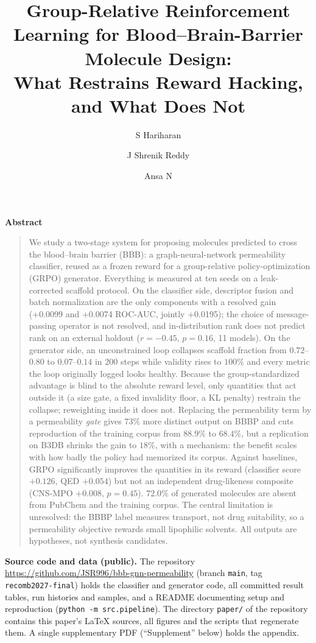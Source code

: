 \documentclass[10pt,letterpaper]{article}
\title{Group-Relative Reinforcement Learning for Blood--Brain-Barrier Molecule Design:\\
What Restrains Reward Hacking, and What Does Not}
\author{S Hariharan \and J Shrenik Reddy \and Ansa N}
\date{}
\newcommand{\REPO}{\url{https://github.com/JSR996/bbb-gnn-permeability}}
\begin{document}
\begin{titlepage}
\maketitle
\thispagestyle{empty}
\begin{center}\textbf{Abstract}\end{center}\vspace{-0.5em}\begin{quote}\noindent
We study a two-stage system for proposing molecules predicted to cross the blood--brain barrier (BBB): a graph-neural-network permeability classifier, reused as a frozen reward for a group-relative policy-optimization (GRPO) generator. Everything is measured at ten seeds on a leak-corrected scaffold protocol. On the classifier side, descriptor fusion and batch normalization are the only components with a resolved gain (+0.0099 and +0.0074 ROC-AUC, jointly +0.0195); the choice of message-passing operator is not resolved, and in-distribution rank does not predict rank on an external holdout ($r=-0.45$, $p=0.16$, 11 models). On the generator side, an unconstrained loop collapses scaffold fraction from $0.72$--$0.80$ to $0.07$--$0.14$ in 200 steps while validity rises to $100\%$ and every metric the loop originally logged looks healthy. Because the group-standardized advantage is blind to the absolute reward level, only quantities that act outside it (a size gate, a fixed invalidity floor, a KL penalty) restrain the collapse; reweighting inside it does not. Replacing the permeability term by a permeability \emph{gate} gives $73\%$ more distinct output on BBBP and cuts reproduction of the training corpus from $88.9\%$ to $68.4\%$, but a replication on B3DB shrinks the gain to $18\%$, with a mechanism: the benefit scales with how badly the policy had memorized its corpus. Against baselines, GRPO significantly improves the quantities in its reward (classifier score $+0.126$, QED $+0.054$) but not an independent drug-likeness composite (CNS-MPO $+0.008$, $p=0.45$). $72.0\%$ of generated molecules are absent from PubChem and the training corpus. The central limitation is unresolved: the BBBP label measures transport, not drug suitability, so a permeability objective rewards small lipophilic solvents. All outputs are hypotheses, not synthesis candidates.
\end{quote}
\vspace{1.5em}
\noindent\textbf{Source code and data (public).} The repository \REPO{} (branch \texttt{main}, tag \texttt{recomb2027-final}) holds the classifier and generator code, all committed result tables, run histories and samples, and a README documenting setup and reproduction (\texttt{python -m src.pipeline}). The directory \texttt{paper/} of the repository contains this paper's \LaTeX{} sources, all figures and the scripts that regenerate them. A single supplementary PDF (``Supplement'' below) holds the appendix.
\end{titlepage}
\end{document}

